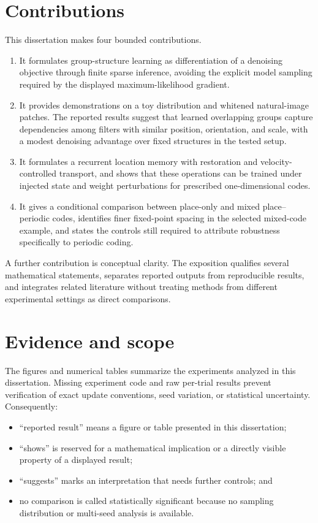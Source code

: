 \section{Contributions}
\label{sec:intro-contributions}

This dissertation makes four bounded contributions.

\begin{enumerate}[label=\textbf{C\arabic*.}]
  \item It formulates group-structure learning as differentiation of a denoising objective through finite sparse inference, avoiding the explicit model sampling required by the displayed maximum-likelihood gradient.
  \item It provides demonstrations on a toy distribution and whitened natural-image patches. The reported results suggest that learned overlapping groups capture dependencies among filters with similar position, orientation, and scale, with a modest denoising advantage over fixed structures in the tested setup.
  \item It formulates a recurrent location memory with restoration and velocity-controlled transport, and shows that these operations can be trained under injected state and weight perturbations for prescribed one-dimensional codes.
  \item It gives a conditional comparison between place-only and mixed place--periodic codes, identifies finer fixed-point spacing in the selected mixed-code example, and states the controls still required to attribute robustness specifically to periodic coding.
\end{enumerate}

A further contribution is conceptual clarity. The exposition qualifies several mathematical statements, separates reported outputs from reproducible results, and integrates related literature without treating methods from different experimental settings as direct comparisons.

\section{Evidence and scope}
\label{sec:intro-scope}

The figures and numerical tables summarize the experiments analyzed in this dissertation. Missing experiment code and raw per-trial results prevent verification of exact update conventions, seed variation, or statistical uncertainty. Consequently:

\begin{itemize}
  \item ``reported result'' means a figure or table presented in this dissertation;
  \item ``shows'' is reserved for a mathematical implication or a directly visible property of a displayed result;
  \item ``suggests'' marks an interpretation that needs further controls; and
  \item no comparison is called statistically significant because no sampling distribution or multi-seed analysis is available.
\end{itemize}

